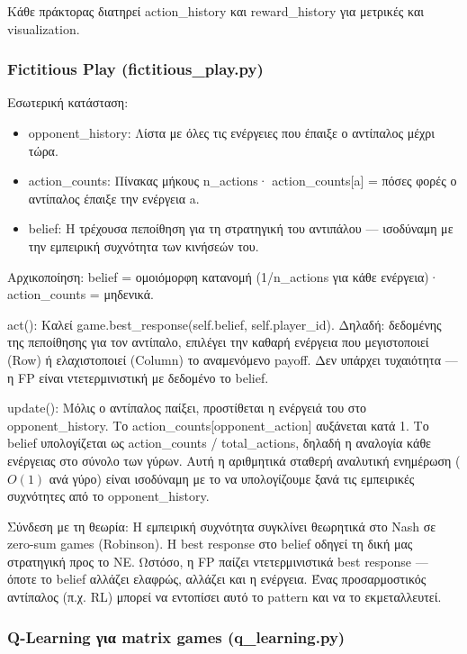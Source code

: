\documentclass[11pt,a4paper]{article}
\newcommand{\eng}[1]{\foreignlanguage{english}{#1}}
\begin{document}
Κάθε πράκτορας διατηρεί \eng{action\_history} και \eng{reward\_history} για μετρικές και visualization.

\subsubsection{Fictitious Play (\eng{fictitious\_play.py})}

Εσωτερική κατάσταση:

\begin{itemize}
\item \eng{opponent\_history}: Λίστα με όλες τις ενέργειες που έπαιξε ο αντίπαλος μέχρι τώρα.
\item \eng{action\_counts}: Πίνακας μήκους n\_actions· action\_counts[a] = πόσες φορές ο αντίπαλος έπαιξε την ενέργεια a.
\item \eng{belief}: Η τρέχουσα πεποίθηση για τη στρατηγική του αντιπάλου — ισοδύναμη με την εμπειρική συχνότητα των κινήσεών του.
\end{itemize}

Αρχικοποίηση: belief = ομοιόμορφη κατανομή (1/n\_actions για κάθε ενέργεια)· action\_counts = μηδενικά.

\eng{act()}: Καλεί \eng{game.best\_response(self.belief, self.player\_id)}. Δηλαδή: δεδομένης της πεποίθησης για τον αντίπαλο, επιλέγει την καθαρή ενέργεια που μεγιστοποιεί (Row) ή ελαχιστοποιεί (Column) το αναμενόμενο payoff. Δεν υπάρχει τυχαιότητα — η FP είναι ντετερμινιστική με δεδομένο το belief.

\eng{update()}: Μόλις ο αντίπαλος παίξει, προστίθεται η ενέργειά του στο opponent\_history. Το action\_counts[opponent\_action] αυξάνεται κατά 1. Το belief υπολογίζεται ως action\_counts / total\_actions, δηλαδή η αναλογία κάθε ενέργειας στο σύνολο των γύρων. Αυτή η αριθμητικά σταθερή αναλυτική ενημέρωση (\(O(1)\) ανά γύρο) είναι ισοδύναμη με το να υπολογίζουμε ξανά τις εμπειρικές συχνότητες από το opponent\_history.

Σύνδεση με τη θεωρία: Η εμπειρική συχνότητα συγκλίνει θεωρητικά στο Nash σε zero-sum games (Robinson). Η best response στο belief οδηγεί τη δική μας στρατηγική προς το NE. Ωστόσο, η FP παίζει ντετερμινιστικά best response — όποτε το belief αλλάζει ελαφρώς, αλλάζει και η ενέργεια. Ένας προσαρμοστικός αντίπαλος (π.χ. RL) μπορεί να εντοπίσει αυτό το pattern και να το εκμεταλλευτεί.

\subsubsection{Q-Learning για matrix games (\eng{q\_learning.py})}
\end{document}
